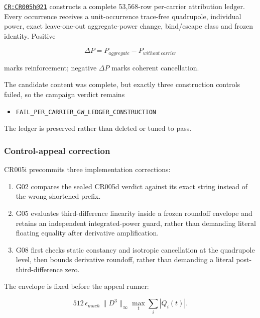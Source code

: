 \href{https://github.com/iwtbotiwtwot/SAMA/blob/4c2b5dc1649da5900c90b90d0ce56c223dbb7717/tests/courtroom/21-gravitational-waves-cr005h-starbreaker-per-carrier-gw-candidate-ledger/README.md}{\texttt{CR:CR005h@21}}
constructs a complete 53,568-row per-carrier attribution ledger. Every
occurrence receives a unit-occurrence trace-free quadrupole, individual
power, exact leave-one-out aggregate-power change, bind/escape class and
frozen identity. Positive

\[
\Delta P=P_{aggregate}-P_{without\ carrier}
\]

marks reinforcement; negative \(\Delta P\) marks coherent cancellation.

The candidate content was complete, but exactly three construction
controls failed, so the campaign verdict remains

\begin{itemize}
\tightlist
\item
  \nolinkurl{FAIL_PER_CARRIER_GW_LEDGER_CONSTRUCTION}
\end{itemize}

The ledger is preserved rather than deleted or tuned to pass.

\subsubsection{Control-appeal
correction}\label{viii-ch08-control-appeal-correction}

CR005i precommits three implementation corrections:

\begin{enumerate}
\def\labelenumi{\arabic{enumi}.}
\tightlist
\item
  G02 compares the sealed CR005d verdict against its exact string
  instead of the wrong shortened prefix.
\item
  G05 evaluates third-difference linearity inside a frozen roundoff
  envelope and retains an independent integrated-power guard, rather
  than demanding literal floating equality after derivative
  amplification.
\item
  G08 first checks static constancy and isotropic cancellation at the
  quadrupole level, then bounds derivative roundoff, rather than
  demanding a literal post-third-difference zero.
\end{enumerate}

The envelope is fixed before the appeal runner:

\[
512\,\epsilon_{mach}\,\|D^3\|_\infty
\max_t\sum_i|Q_i(t)|.
\]

